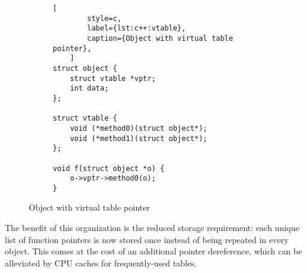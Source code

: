 \begin{figure}[ht]
    \centering
    \begin{subfigure}[c]{0.45\textwidth}
        \begin{lstlisting}[
        style=c,
        label={lst:c++:vtable},
        caption={Object with virtual table pointer},
    ]
struct object {
    struct vtable *vptr;
    int data;
};

struct vtable {
    void (*method0)(struct object*);
    void (*method1)(struct object*);
};

void f(struct object *o) {
    o->vptr->method0(o);
}
        \end{lstlisting}
    \end{subfigure}
    \hspace{1em}
    \begin{subfigure}[c]{0.5\textwidth}
    \end{subfigure}
    \caption{Object with virtual table pointer}
    \label{fig:c++:vtable}
\end{figure}

The benefit of this organization is the reduced storage requirement: each unique
list of function pointers is now stored once instead of being repeated in every
object.  This comes at the cost of an additional pointer dereference, which can
be alleviated by CPU caches for frequently-used tables.

